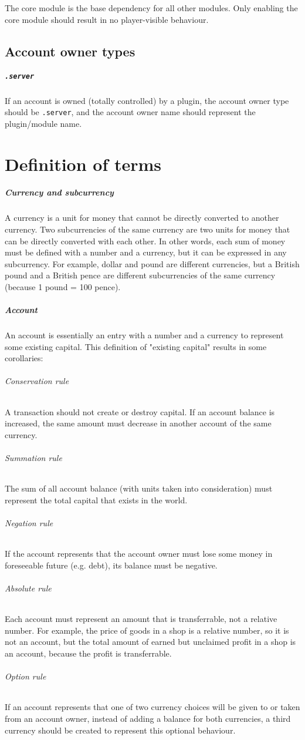 \documentclass{report}
\begin{document}
			The core module is the base dependency for all other modules. Only enabling the core module should result in no player-visible behaviour.

			\section{Account owner types}
				\paragraph{\texttt{.server}}
					If an account is owned (totally controlled) by a plugin,
					the account owner type should be \texttt{.server},
					and the account owner name should represent the plugin/module name.

		\chapter{Definition of terms}

			\paragraph{Currency and subcurrency}
				A currency is a unit for money that cannot be directly converted to another currency.
				Two subcurrencies of the same currency are two units for money that can be directly converted with each other.
				In other words, each sum of money must be defined with a number and a currency, but it can be expressed in any subcurrency.
				For example, dollar and pound are different currencies, but a British pound and a British pence are different subcurrencies of the same currency
				(because 1 pound = 100 pence).

			\paragraph{Account}
				An account is essentially an entry with a number and a currency to represent some existing capital.
				This definition of "existing capital" results in some corollaries:
				\subparagraph{Conservation rule} A transaction should not create or destroy capital.
					If an account balance is increased, the same amount must decrease in another account of the same currency.
				\subparagraph{Summation rule} The sum of all account balance (with units taken into consideration) must represent the total capital that exists in the world.
				\subparagraph{Negation rule} If the account represents that the account owner must lose some money in foreseeable future (e.g. debt), its balance must be negative.
				\subparagraph{Absolute rule} Each account must represent an amount that is transferrable, not a relative number.
					For example, the price of goods in a shop is a relative number, so it is not an account,
					but the total amount of earned but unclaimed profit in a shop is an account, because the profit is transferrable.
				\subparagraph{Option rule} If an account represents that one of two currency choices will be given to or taken from an account owner,
					instead of adding a balance for both currencies, a third currency should be created to represent this optional behaviour.
\end{document}

